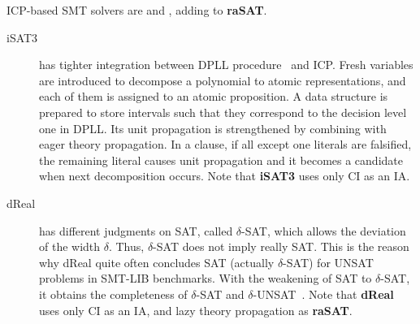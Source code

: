\documentclass[runningheads,a4paper,oribibl]{llncs}
\begin{document}
ICP-based SMT solvers are  and , adding to \textbf{raSAT}. 
\begin{description}
\item[iSAT3] has tighter integration between DPLL procedure~\cite{dpll} and ICP. 
Fresh variables are introduced to decompose a polynomial to atomic representations, 
and each of them is assigned to an atomic proposition. 
A data structure is prepared to store intervals such that 
they correspond to the decision level one in DPLL. 
Its unit propagation is strengthened by combining with eager theory propagation. 
In a clause, if all except one literals are falsified, the remaining literal causes unit propagation 
and it becomes a candidate when next decomposition occurs. 
Note that \textbf{iSAT3} uses only CI as an IA. 

\item[dReal] has different judgments on SAT, called $\delta$-SAT, which allows the deviation of the width $\delta$. 
Thus, $\delta$-SAT does not imply really SAT. This is the reason why dReal quite often concludes SAT (actually $\delta$-SAT) 
for UNSAT problems in SMT-LIB benchmarks. With the weakening of SAT to $\delta$-SAT, it obtains the completeness of 
$\delta$-SAT and $\delta$-UNSAT~\cite{Gao:2012:9DP:2352896.2352921}. 
Note that \textbf{dReal} uses only CI as an IA, and lazy theory propagation as {\bf raSAT}. 
\end{description}
\end{document}
